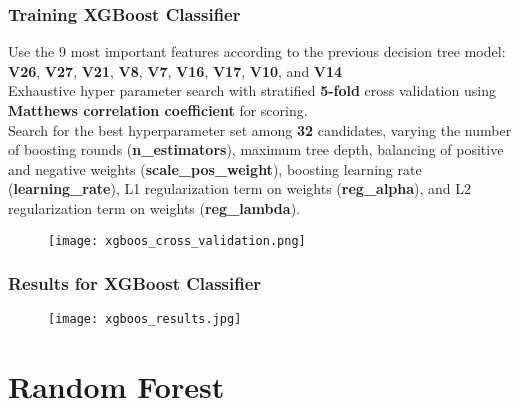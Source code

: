 \documentclass[11pt]{beamer}
\begin{document}
\begin{frame}[fragile]
  \frametitle{\normalsize{\textbf{
    Training XGBoost Classifier
  }}} 

  \scriptsize{  

    \textbullet \: Use the 9 most important features according to the previous 
    decision tree model: \textbf{V26}, \textbf{V27}, \textbf{V21}, \textbf{V8}, 
    \textbf{V7}, \textbf{V16}, \textbf{V17}, \textbf{V10}, and \textbf{V14} \\[0.25cm]

    \textbullet \: Exhaustive hyper parameter search with stratified \textbf{5-fold} 
    cross validation using \textbf{Matthews correlation coefficient} for scoring. \\[0.25cm]

    \textbullet \: Search for the best hyperparameter set among \textbf{32} candidates, 
    varying the number of boosting rounds (\textbf{n\_estimators}), maximum tree depth, 
    balancing of positive and negative weights 
    (\textbf{scale\_pos\_weight}), boosting learning rate (\textbf{learning\_rate}), 
    L1 regularization term on weights (\textbf{reg\_alpha}), and L2 regularization term 
    on weights (\textbf{reg\_lambda}).

    \begin{figure}[h!]
      \centering
      \texttt{[image: xgboos\_cross\_validation.png]}
    \end{figure}
  }
\end{frame}

\begin{frame}[fragile]
  \frametitle{\normalsize{\textbf{
    Results for XGBoost Classifier
  }}} 

  \scriptsize{  

    \begin{figure}[h!]
      \centering
      \texttt{[image: xgboos\_results.jpg]}
    \end{figure}  
  }
\end{frame}

\section{Random Forest}
\end{document}
